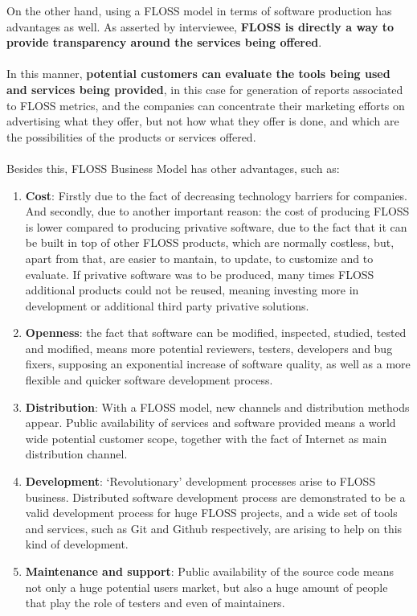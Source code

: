 \documentclass[11pt]{article}
\begin{document}
On the other hand, using a FLOSS model in terms of software production has advantages as well. As asserted by interviewee, \textbf{FLOSS is directly a way to provide transparency around the services being offered}.\\
\\
In this manner, \textbf{potential customers can evaluate the tools being used and services being provided}, in this case for generation of reports associated to FLOSS metrics, and the companies can concentrate their marketing efforts on advertising what they offer, but not how what they offer is done, and which are the possibilities of the products or services offered.\\
\\
Besides this, FLOSS Business Model has other advantages, such as:
\begin{enumerate}
\item{\textbf{Cost}}: Firstly due to the fact of decreasing technology barriers for companies. And secondly, due to another important reason: the cost of producing FLOSS is lower compared to producing privative software, due to the fact that it can be built in top of other FLOSS products, which are normally costless, but, apart from that, are easier to mantain, to update, to customize and to evaluate. If privative software was to be produced, many times FLOSS additional products could not be reused, meaning investing more in development or additional third party privative solutions.
\item{\textbf{Openness}}: the fact that software can be modified, inspected, studied, tested and modified, means more potential reviewers, testers, developers and bug fixers, supposing an exponential increase of software quality, as well as a more flexible and quicker software development process.
\item{\textbf{Distribution}}: With a FLOSS model, new channels and distribution methods appear. Public availability of services and software provided means a world wide potential customer scope, together with the fact of Internet as main distribution channel.
\item{\textbf{Development}}: ‘Revolutionary’ development processes arise to FLOSS business. Distributed software development process are demonstrated to be a valid development process for huge FLOSS projects, and a wide set of tools and services, such as Git and Github respectively, are arising to help on this kind of development.
\item{\textbf{Maintenance and support}}: Public availability of the source code means not only a huge potential users market, but also a huge amount of people that play the role of testers and even of maintainers.
\end{enumerate}
\end{document}
